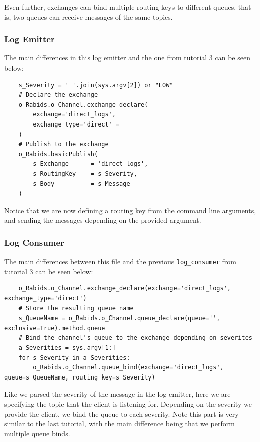 \documentclass{article}
\begin{document}
Even further, exchanges can bind multiple routing keys to different queues, that is, two queues can receive messages of the same topics.

\subsubsection{Log Emitter}

The main differences in this log emitter and the one from tutorial 3 can be seen below:

\begin{verbatim}
    s_Severity = ' '.join(sys.argv[2]) or "LOW"
    # Declare the exchange
    o_Rabids.o_Channel.exchange_declare(
        exchange='direct_logs', 
        exchange_type='direct' =
    )
    # Publish to the exchange
    o_Rabids.basicPublish(
        s_Exchange      = 'direct_logs',
        s_RoutingKey    = s_Severity,
        s_Body          = s_Message
    )
\end{verbatim}

Notice that we are now defining a routing key from the command line arguments, and sending the messages depending on the provided argument.

\subsubsection{Log Consumer}


The main differences between this file and the previous \verb|log_consumer| from tutorial 3 can be seen below:

\begin{verbatim}
    o_Rabids.o_Channel.exchange_declare(exchange='direct_logs', exchange_type='direct')
    # Store the resulting queue name
    s_QueueName = o_Rabids.o_Channel.queue_declare(queue='', exclusive=True).method.queue
    # Bind the channel's queue to the exchange depending on severites
    a_Severities = sys.argv[1:]
    for s_Severity in a_Severities:
        o_Rabids.o_Channel.queue_bind(exchange='direct_logs', queue=s_QueueName, routing_key=s_Severity)
\end{verbatim}

Like we parsed the severity of the message in the log emitter, here we are specifying the topic that the client is listening for. Depending on the severity we provide the client, we bind the queue to each severity. Note this part is very similar to the last tutorial, with the main difference being that we perform multiple queue binds.
\end{document}

